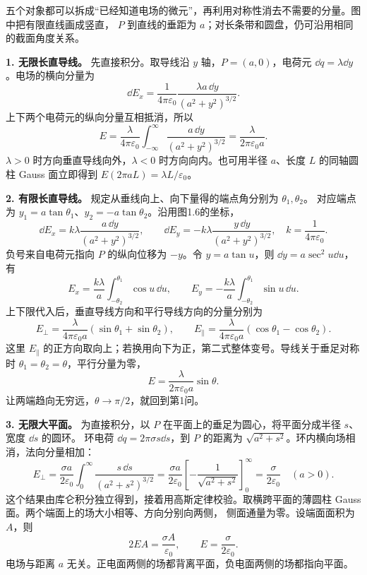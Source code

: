 \begin{xesolution}
五个对象都可以拆成“已经知道电场的微元”，再利用对称性消去不需要的分量。图中把有限直线画成竖直，
$P$ 到直线的垂距为 $a$；对长条带和圆盘，仍可沿用相同的截面角度关系。

\extendedChargeFigure
{}

\textbf{1. 无限长直导线。} 先直接积分。取导线沿 $y$ 轴，$P=(a,0)$，电荷元
$\dd q=\lambda\dd y$。电场的横向分量为
\[
  \dd E_x=\frac{1}{4\pi\varepsilon_0}
  \frac{\lambda a\,\dd y}{(a^2+y^2)^{3/2}}.
\]
上下两个电荷元的纵向分量互相抵消，所以
\[
  E=\frac{\lambda}{4\pi\varepsilon_0}
  \int_{-\infty}^{\infty}\frac{a\,\dd y}{(a^2+y^2)^{3/2}}
  =\boxed{\frac{\lambda}{2\pi\varepsilon_0a}}.
\]
$\lambda>0$ 时方向垂直导线向外，$\lambda<0$ 时方向向内。也可用半径 $a$、长度 $L$ 的同轴圆柱
Gauss 面立即得到 $E(2\pi aL)=\lambda L/\varepsilon_0$。

\textbf{2. 有限长直导线。} 规定从垂线向上、向下量得的端点角分别为 $\theta_1,\theta_2$。
对应端点为 $y_1=a\tan\theta_1$、$y_2=-a\tan\theta_2$。沿用图1.6的坐标，
\[
 \dd E_x=k\lambda\frac{a\,\dd y}{(a^2+y^2)^{3/2}},\qquad
 \dd E_y=-k\lambda\frac{y\,\dd y}{(a^2+y^2)^{3/2}},\quad k=\frac1{4\pi\varepsilon_0}.
\]
负号来自电荷元指向 $P$ 的纵向位移为 $-y$。令 $y=a\tan u$，则 $\dd y=a\sec^2u\dd u$，有
\[
 E_x=\frac{k\lambda}{a}\int_{-\theta_2}^{\theta_1}\cos u\,\dd u,
 \qquad E_y=-\frac{k\lambda}{a}\int_{-\theta_2}^{\theta_1}\sin u\,\dd u.
\]
上下限代入后，垂直导线方向和平行导线方向的分量分别为
\[
  \boxed{E_\perp=\frac{\lambda}{4\pi\varepsilon_0a}
  (\sin\theta_1+\sin\theta_2)},
  \qquad
  \boxed{E_\parallel=\frac{\lambda}{4\pi\varepsilon_0a}
  (\cos\theta_1-\cos\theta_2)}.
\]
这里 $E_\parallel$ 的正方向取向上；若换用向下为正，第二式整体变号。导线关于垂足对称时
$\theta_1=\theta_2=\theta$，平行分量为零，
\[
  \boxed{E=\frac{\lambda}{2\pi\varepsilon_0a}\sin\theta}.
\]
让两端趋向无穷远，$\theta\to\pi/2$，就回到第1问。

\textbf{3. 无限大平面。} 为直接积分，以 $P$ 在平面上的垂足为圆心，将平面分成半径 $s$、宽度 $\dd s$ 的圆环。
环电荷 $\dd q=2\pi\sigma s\dd s$，到 $P$ 的距离为 $\sqrt{a^2+s^2}$。环内横向场相消，法向分量相加：
\[
 E_\perp=\frac{\sigma a}{2\varepsilon_0}\int_0^\infty
 \frac{s\,\dd s}{(a^2+s^2)^{3/2}}
 =\frac{\sigma a}{2\varepsilon_0}
 \left[-\frac1{\sqrt{a^2+s^2}}\right]_0^\infty
 =\frac{\sigma}{2\varepsilon_0}\quad(a>0).
\]
这个结果由库仑积分独立得到，接着用高斯定律校验。取横跨平面的薄圆柱 Gauss 面。两个端面上的场大小相等、方向分别向两侧，
侧面通量为零。设端面面积为 $A$，则
\[
  2EA=\frac{\sigma A}{\varepsilon_0},
  \qquad
  \boxed{E=\frac{\sigma}{2\varepsilon_0}}.
\]
电场与距离 $a$ 无关。正电面两侧的场都背离平面，负电面两侧的场都指向平面。


\end{xesolution}
